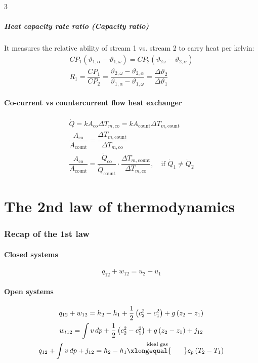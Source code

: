 \documentclass[9pt, landscape, a4paper]{article}
\begin{document}
\begin{multicols*}{3}
\subsubsection{Heat capacity rate ratio (Capacity ratio)}
It measures the relative ability of stream 1 vs. stream 2 to carry
heat per kelvin:
\begin{gather*}
  CP_1 \left(\vartheta_{1, \alpha} - \vartheta _{1, \omega}\right) = CP_2 \left(\vartheta_{2\omega} - \vartheta_{2,\alpha}\right)\\[1ex]
  R_1 = \dfrac{CP_1}{CP_2} = \dfrac{\vartheta_{2,\omega} - \vartheta_{2,\alpha}}{\vartheta_{1,\alpha}-\vartheta_{1,\omega}} = \dfrac{\Delta \vartheta_2}{\Delta \vartheta_1}
\end{gather*}

\subsection{Co-current vs countercurrent flow heat exchanger}
\begin{gather*}
  \dot{Q} = kA_\text{co}\Delta T_{m,\text{co}} = kA_\text{count}\Delta T_{m,\text{count}}\\
  \dfrac{A_\text{co}}{A_\text{count}} = \dfrac{\Delta T_{m,\text{count}}}{\Delta T_{m,\text{co}}}\\[1ex]
  \dfrac{A_\text{co}}{A_\text{count}} = \dfrac{\dot{Q}_\text{co}}{\dot{Q}_\text{count}}\cdot \dfrac{\Delta T_{m,\text{count}}}{\Delta T_{m,\text{co}}},\quad \text{if } \dot{Q}_1 \neq \dot{Q}_2
\end{gather*}

\newcolumn
\vspace*{-.7cm}
\part{The 2nd law of thermodynamics}
\section{Recap of the 1st law}
\subsection{Closed systems}
\[q_{12} + w_{12} = u_2 - u_1\]

\subsection{Open systems}
\begin{gather*}
  q_{12} + w_{12} = h_2 - h_1 + \dfrac{1}{2}\left(c_2^2 - c_1^2\right) + g\left(z_2 - z_1\right)\\
  w_{t12} = \integral[v][p] + \dfrac{1}{2}\left(c_2^2 - c_1^2\right) + g\left(z_2 - z_1\right) + j_{12}\\
  q_{12} + \integral[v][p] + j_{12} = h_2 - h_1 \overset{\text{ideal gas}}{\xlongequal{\hspace{18pt}}} c_p\left(T_2 - T_1\right)
\end{gather*}


\end{multicols*}
\end{document}
